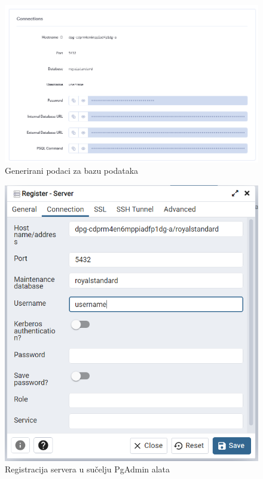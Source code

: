 		\begin{figure}[H]
			\includegraphics[width=\textwidth]{slike/Baza2.PNG} 
			\caption{Generirani podaci za bazu podataka}
			\label{fig:Generirani podaci za bazu}
		\end{figure}
	
		\begin{figure}[H]
			\includegraphics[width=\textwidth]{slike/registracijaservera.PNG} 
			\caption{Registracija servera u sučelju PgAdmin alata}
			\label{fig:Registracija servera baze podataka}
		\end{figure}
	
